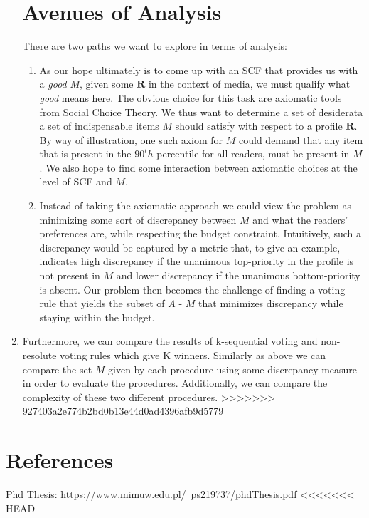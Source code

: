 \documentclass[10pt,a4paper,english]{article}
\begin{document}
\begin{enumerate}
\section{Avenues of Analysis} 
There are two paths we want to explore in terms of analysis:
\begin{enumerate}
\item As our hope ultimately is to come up with an SCF that provides us with a \textit{good} $M$, given some $\mathbf{R}$ in the context of media, we must qualify what \textit{good} means here. The obvious choice for this task are axiomatic tools from Social Choice Theory. We thus want to determine a set of desiderata a set of indispensable items $M$ should satisfy with respect to a profile $\mathbf{R}$. By way of illustration, one such axiom for $M$ could demand that any item that is present in the $90^th$ percentile for all readers, must be present in $M$.
We also hope to find some interaction between axiomatic choices at the level of SCF and $M$.
\item Instead of taking the axiomatic approach we could view the problem as minimizing some sort of discrepancy between $M$ and what the readers' preferences are, while respecting the budget constraint. Intuitively, such a discrepancy would be captured by a metric that, to give an example, indicates high discrepancy if the unanimous top-priority in the profile is not present in $M$ and lower discrepancy if the unanimous bottom-priority is absent. Our problem then becomes the challenge of finding a voting rule that yields the subset of $A$ - $M$ that minimizes discrepancy while staying within the budget.
\end{enumerate}
\item Furthermore, we can compare the results of k-sequential voting and non-resolute voting rules which give K winners. Similarly as above we can compare the set $M$ given by each procedure using some discrepancy measure in order to evaluate the procedures. Additionally, we can compare the complexity of these two different procedures.
>>>>>>> 927403a2e774b2bd0b13e44d0ad4396afb9d5779
\end{enumerate}

\section{References}
Phd Thesis: https://www.mimuw.edu.pl/~ps219737/phdThesis.pdf
<<<<<<< HEAD
\end{document}
